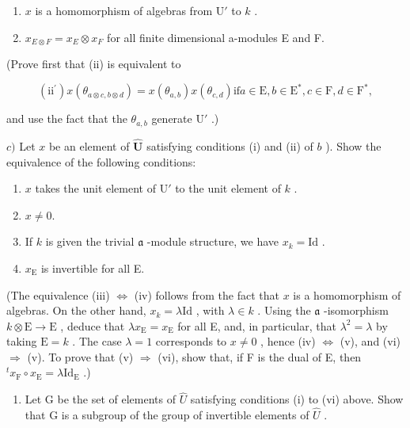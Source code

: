 \begin{enumerate}
\def\labelenumi{(\roman{enumi})}
\item
  \(x\) is a homomorphism of algebras from \(\mathrm{U}'\) to \(k\) .
\item
  \(x_{E \otimes F} = x_{E} \otimes x_{F}\) for all finite dimensional a-modules E and F.
\end{enumerate}

(Prove first that (ii) is equivalent to

\[
\left(\mathrm{ii} ^ {\prime}\right) x \left(\theta_ {a \otimes c, b \otimes d}\right) = x \left(\theta_ {a, b}\right) x \left(\theta_ {c, d}\right) \text {if} a \in \mathrm{E}, b \in \mathrm{E} ^ {*}, c \in \mathrm{F}, d \in \mathrm{F} ^ {*},
\]

and use the fact that the \(\theta_{a,b}\) generate \(\mathrm{U}'\) .)

\(c)\) Let \(x\) be an element of \(\hat{\mathbf{U}}\) satisfying conditions (i) and (ii) of \(b\) ). Show the equivalence of the following conditions:

\begin{enumerate}
\def\labelenumi{(\roman{enumi})}
\setcounter{enumi}{2}
\item
  \(x\) takes the unit element of \(\mathrm{U}'\) to the unit element of \(k\) .
\item
  \(x \neq 0.\)
\item
  If \(k\) is given the trivial \(\mathfrak{a}\) -module structure, we have \(x_{k} = \mathrm{Id}\) .
\item
  \(x_{\mathrm{E}}\) is invertible for all E.
\end{enumerate}

(The equivalence (iii) \(\Longleftrightarrow\) (iv) follows from the fact that \(x\) is a homomorphism of algebras. On the other hand, \(x_{k} = \lambda \mathrm{Id}\) , with \(\lambda \in k\) . Using the \(\mathfrak{a}\) -isomorphism \(k \otimes \mathrm{E} \to \mathrm{E}\) , deduce that \(\lambda x_{\mathrm{E}} = x_{\mathrm{E}}\) for all E, and, in particular, that \(\lambda^2 = \lambda\) by taking \(\mathrm{E} = k\) . The case \(\lambda = 1\) corresponds to \(x \neq 0\) , hence (iv) \(\Longleftrightarrow\) (v), and (vi) \(\Longrightarrow\) (v). To prove that (v) \(\Longrightarrow\) (vi), show that, if F is the dual of E, then \(^t x_{\mathrm{F}} \circ x_{\mathrm{E}} = \lambda \mathrm{Id}_{\mathrm{E}}\) .)

\begin{enumerate}
\def\labelenumi{\alph{enumi})}
\setcounter{enumi}{3}
\tightlist
\item
  Let G be the set of elements of \(\hat{U}\) satisfying conditions (i) to (vi) above. Show that G is a subgroup of the group of invertible elements of \(\hat{U}\) .
\end{enumerate}

